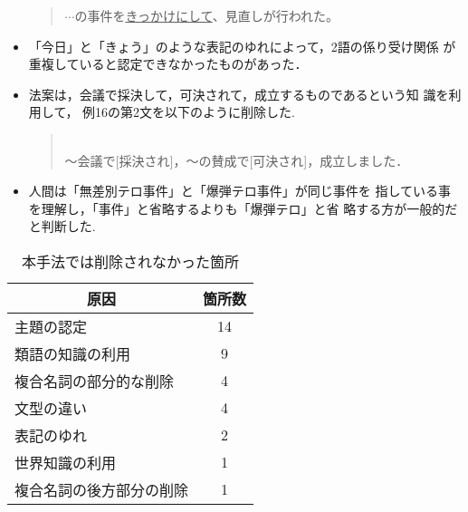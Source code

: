 \begin{itemize}
\begin{quote}
	$\cdots$の事件を\underline{きっかけにして}、見直しが行われた。
       \end{quote}\vspace{5mm}
 \item 「今日」と「きょう」のような表記のゆれによって，2語の係り受け関係
       が重複していると認定できなかったものがあった．
 \item 法案は，会議で採決して，可決されて，成立するものであるという知
       識を利用して，
       例16の第2文を以下のように削除した.
\vspace{5mm}	 \begin{quote}
	  \hspace*{-1em}{\bf 例18：}\\
	  〜会議で[採決され]，〜の賛成で[可決され]，成立しました．
	 \end{quote}\vspace{5mm}
 \item 人間は「無差別テロ事件」と「爆弾テロ事件」が同じ事件を
       指している事を理解し，「事件」と省略するよりも「爆弾テロ」と省
       略する方が一般的だと判断した.
\end{itemize}

\begin{table}[t]
\begin{center}
\caption[原因1]{本手法では削除されなかった箇所} \label{tab:saigen_kasho}
\begin{tabular}{|l|c|}
\hline
\multicolumn{1}{|c|}{原因}&箇所数\\
\hline \hline
主題の認定               & 14 \\ \hline
類語の知識の利用         &  9 \\ \hline
複合名詞の部分的な削除   &  4 \\ \hline
文型の違い               &  4 \\ \hline
表記のゆれ               &  2 \\ \hline
世界知識の利用           &  1 \\ \hline
複合名詞の後方部分の削除 &  1 \\ \hline
\end{tabular}
\end{center}
\end{table}

